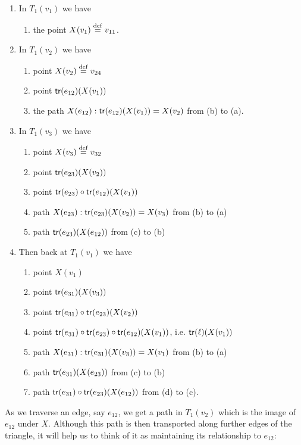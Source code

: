 \begin{enumerate}
\item In \( T_1(v_1) \) we have 
\begin{enumerate}
\item the point \( X(v_1)\stackrel{\mathrm{def}}{=} v_{11} \).
\end{enumerate}
\item In \( T_1(v_2) \) we have
\begin{enumerate}
\item point \( X(v_2)\stackrel{\mathrm{def}}{=} v_{24} \)
\item point \( \mathsf{tr}(e_{12})(X(v_1)) \)
\item the path \( X(e_{12}):\mathsf{tr}(e_{12})(X(v_1))=X(v_2) \) from (b) to (a).
\end{enumerate}
\item In \( T_1(v_3) \) we have 
\begin{enumerate}
\item point \( X(v_3)\stackrel{\mathrm{def}}{=} v_{32} \)
\item point \( \mathsf{tr}(e_{23})(X(v_2)) \)
\item point \( \mathsf{tr}(e_{23})\circ\mathsf{tr}(e_{12})(X(v_1)) \)
\item path \( X(e_{23}):\mathsf{tr}(e_{23})(X(v_2))=X(v_3) \) from (b) to (a)
\item path \( \mathsf{tr}(e_{23})(X(e_{12})) \) from (c) to (b)
\end{enumerate}
\item Then back at \( T_1(v_1) \) we have
\begin{enumerate}
\item point \( X(v_1) \)
\item point \( \mathsf{tr}(e_{31})(X(v_3)) \)
\item point \( \mathsf{tr}(e_{31})\circ\mathsf{tr}(e_{23})(X(v_2)) \)
\item point \( \mathsf{tr}(e_{31})\circ\mathsf{tr}(e_{23})\circ\mathsf{tr}(e_{12})(X(v_1)) \), i.e. \( \mathsf{tr}(\ell)(X(v_1)) \)
\item path \( X(e_{31}): \mathsf{tr}(e_{31})(X(v_3))=X(v_1) \) from (b) to (a)
\item path \( \mathsf{tr}(e_{31})(X(e_{23})) \) from (c) to (b)
\item path \( \mathsf{tr}(e_{31})\circ\mathsf{tr}(e_{23})(X(e_{12})) \) from (d) to (c).
\end{enumerate}
\end{enumerate}

As we traverse an edge, say \( e_{12} \), we get a path in \( T_1(v_2) \) which is the image of \( e_{12} \) under \( X \). Although this path is then transported along further edges of the triangle, it will help us to think of it as maintaining its relationship to \( e_{12} \):

